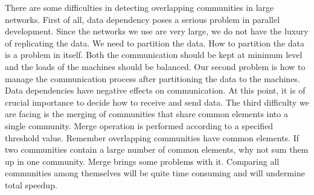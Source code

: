 There are some difficulties in detecting overlapping communities in large networks. First of all, data dependency poses a serious problem in parallel development. Since the networks we use are very large, we do not have the luxury of replicating the data. We need to partition the data. How to partition the data is a problem in itself. Both the communication should be kept at minimum level and the loads of the machines should be balanced. Our second problem is how to manage the communication process after partitioning the data to the machines. Data dependencies have negative effects on communication. At this point, it is of crucial importance to decide how to receive and send data. The third difficulty we are facing is the merging of communities that share common elements into a single community. Merge operation is performed according to a specified threshold value. Remember overlapping communities have common elements. If two communities contain a large number of common elements, why not sum them up in one community. Merge brings some problems with it. Comparing all communities among themselves will be quite time consuming and will undermine total speedup.
